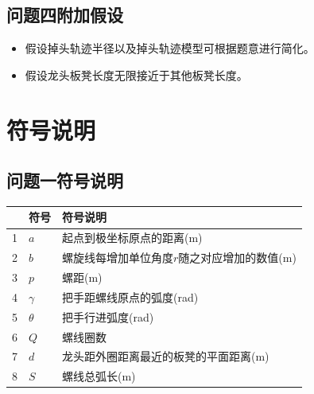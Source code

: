 \documentclass[withoutpreface,bwprint]{cumcmthesis}
\newcommand{\headcol}[1]{\textbf{#1}} %
\begin{document}
\subsection{问题四附加假设}
\begin{itemize}
	\item 假设掉头轨迹半径以及掉头轨迹模型可根据题意进行简化。
	\item 假设龙头板凳长度无限接近于其他板凳长度。
\end{itemize}

\section{符号说明}
\subsection{问题一符号说明}
\begin{table}[htb!]
  \centering
  \small
  \begin{tabular}{p{60pt}<{\centering}|p{60pt}<{\centering}p{180pt}<{\raggedright}}
   \hline
   \rowcolor{gray!25} %
   \headcol \textbf{序号} & \textbf{符号} & \textbf{符号说明} \\
   \hline
    1 & $a$ & 起点到极坐标原点的距离(m) \\
    2 & $b$ & 螺旋线每增加单位角度$r$随之对应增加的数值(m)  \\
    3 & $p$ & 螺距(m)\\
    4 & $\gamma$ &把手距螺线原点的弧度(rad)\\
    5 & $\theta$ &   把手行进弧度(rad)\\
    6 & $Q$ & 螺线圈数 \\
    7 & $d$ & 龙头距外圈距离最近的板凳的平面距离(m) \\
    8 & $S$ & 螺线总弧长(m) \\

	\hline
  \end{tabular}
  \label{symbol}
\end{table}
\end{document}
